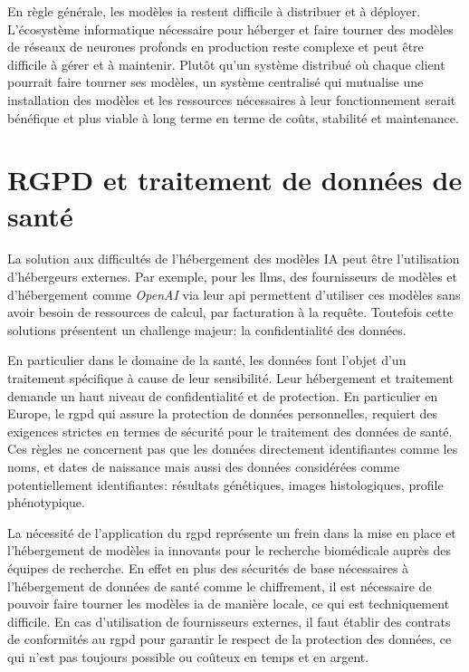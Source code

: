En règle générale, les modèles \gls{ia} restent difficile à distribuer et à déployer. L'écosystème informatique nécessaire pour héberger et faire tourner des modèles de réseaux de neurones profonds en production reste complexe et peut être difficile à gérer et à maintenir. Plutôt qu'un système distribué où chaque client pourrait faire tourner ses modèles,  un système centralisé qui mutualise une installation des modèles et les ressources nécessaires à leur fonctionnement serait bénéfique et plus viable à long terme en terme de coûts, stabilité et maintenance.

\section{RGPD et traitement de données de santé}
La solution aux difficultés de l'hébergement des modèles IA peut être l'utilisation d'hébergeurs externes. Par exemple, pour les \gls{llms}, des fournisseurs de modèles et d'hébergement comme \textit{OpenAI} via leur \gls{api} permettent d'utiliser ces modèles sans avoir besoin de ressources de calcul, par facturation à la requête. Toutefois cette solutions présentent un challenge majeur: la confidentialité des données.

En particulier dans le domaine de la santé, les données font l'objet d'un traitement spécifique à cause de leur sensibilité. Leur hébergement et traitement demande un haut niveau de confidentialité et de protection. En particulier en Europe, le \gls{rgpd} qui assure la protection de données personnelles, requiert des exigences strictes en termes de sécurité pour le traitement des données de santé. Ces règles ne concernent pas que les données directement identifiantes comme les noms, et dates de naissance mais aussi des données considérées comme potentiellement identifiantes: résultats génétiques, images histologiques, profile phénotypique.

La nécessité de l'application du \gls{rgpd} représente un frein dans la mise en place et l'hébergement de modèles \gls{ia} innovants pour le recherche biomédicale auprès des équipes de recherche. En effet en plus des sécurités de base nécessaires à l'hébergement de données de santé comme le chiffrement, il est nécessaire de pouvoir faire tourner les modèles \gls{ia} de manière locale, ce qui est techniquement difficile. En cas d'utilisation de fournisseurs externes, il faut établir des contrats de conformités au \gls{rgpd} pour garantir le respect de la protection des données, ce qui n'est pas toujours possible ou coûteux en temps et en argent.


